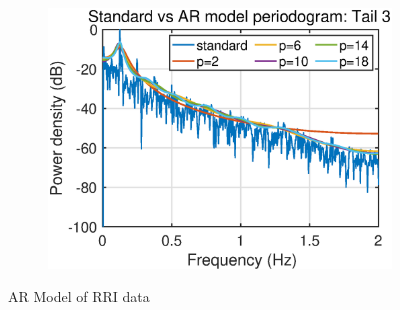 \begin{figure}[t]
\begin{subfigure}[b]{0.4\textwidth}
         \includegraphics[width=\textwidth]{fig/15/15c3.eps}
     \end{subfigure}
        \caption{AR Model of RRI data}
        \label{fig:1_5_c}
\end{figure}










